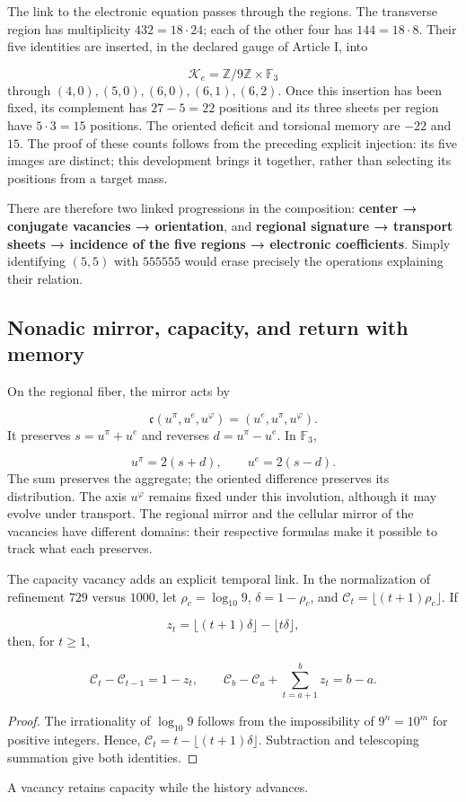 The link to the electronic equation passes through the regions. The transverse region has multiplicity \(432=18\cdot24\); each of the other four has \(144=18\cdot8\). Their five identities are inserted, in the declared gauge of Article I, into

\[
\mathcal K_e=\mathbb Z/9\mathbb Z\times\mathbb F_3
\]
through \((4,0),(5,0),(6,0),(6,1),(6,2)\). Once this insertion has been fixed, its complement has \(27-5=22\) positions and its three sheets per region have \(5\cdot3=15\) positions. The oriented deficit and torsional memory are \(-22\) and \(15\). The proof of these counts follows from the preceding explicit injection: its five images are distinct; this development brings it together, rather than selecting its positions from a target mass.

There are therefore two linked progressions in the composition: \textbf{center → conjugate vacancies → orientation}, and \textbf{regional signature → transport sheets → incidence of the five regions → electronic coefficients}. Simply identifying \((5,5)\) with \(555555\) would erase precisely the operations explaining their relation.

\subsection{Nonadic mirror, capacity, and return with memory}
On the regional fiber, the mirror acts by

\[
\mathfrak c(u^\pi,u^e,u^\varphi)=(u^e,u^\pi,u^\varphi).
\]
It preserves \(s=u^\pi+u^e\) and reverses \(d=u^\pi-u^e\). In \(\mathbb F_3\),

\[
u^\pi=2(s+d),\qquad u^e=2(s-d).
\]
The sum preserves the aggregate; the oriented difference preserves its distribution. The axis \(u^\varphi\) remains fixed under this involution, although it may evolve under transport. The regional mirror and the cellular mirror of the vacancies have different domains: their respective formulas make it possible to track what each preserves.

The capacity vacancy adds an explicit temporal link. In the normalization of refinement \(729\) versus \(1000\), let \(\rho_c=\log_{10}9\), \(\delta=1-\rho_c\), and \(\mathcal C_t=\lfloor(t+1)\rho_c\rfloor\). If

\[
z_t=\lfloor(t+1)\delta\rfloor-\lfloor t\delta\rfloor,
\]
then, for \(t\geq1\),

\[
\mathcal C_t-\mathcal C_{t-1}=1-z_t,
\qquad
\mathcal C_b-\mathcal C_a+\sum_{t=a+1}^b z_t=b-a.
\]
\begin{proof}
The irrationality of \(\log_{10}9\) follows from the impossibility of \(9^n=10^m\) for positive integers. Hence, \(\mathcal C_t=t-\lfloor(t+1)\delta\rfloor\). Subtraction and telescoping summation give both identities. \end{proof}
A vacancy retains capacity while the history advances.

